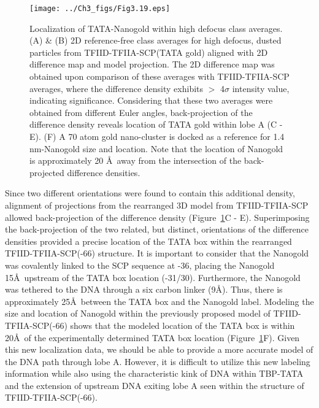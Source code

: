 \begin{figure}
\centering
\texttt{[image: ../Ch3\_figs/Fig3.19.eps]}
\caption[Localization of TATA-Nanogold within high defocus class averages]{Localization of TATA-Nanogold within high defocus class averages. (A) \& (B) 2D reference-free class averages for high defocus, dusted particles from TFIID-TFIIA-SCP(TATA gold) aligned with 2D difference map and model projection. The 2D difference map was obtained upon comparison of these averages with TFIID-TFIIA-SCP averages, where the difference density exhibits $>$ 4$\sigma$ intensity value, indicating significance. Considering that these two averages were obtained from different Euler angles, back-projection of the difference density reveals location of TATA gold within lobe A (C - E). (F) A 70 atom gold nano-cluster \cite{Jadzinsky_2007} is docked as a reference for 1.4 nm-Nanogold size and location. Note that the location of Nanogold is approximately 20 \AA\ away from the intersection of the back-projected difference densities.}
\label{fig:Fig3.19}
\end{figure}
\indent Since two different orientations were found to contain this additional density, alignment of projections from the rearranged 3D model from TFIID-TFIIA-SCP allowed back-projection of the difference density (Figure~\ref{fig:Fig3.19}C - E). Superimposing the back-projection of the two related, but distinct, orientations of the difference densities provided a precise location of the TATA box within the rearranged TFIID-TFIIA-SCP(-66) structure. It is important to consider that the Nanogold was covalently linked to the SCP sequence at -36, placing the Nanogold 15\AA\ upstream of the TATA box location (-31/30).  Furthermore, the Nanogold was tethered to the DNA through a six carbon linker (9\AA). Thus, there is approximately 25\AA\ between the TATA box and the Nanogold label. Modeling the size and location of Nanogold within the previously proposed model of TFIID-TFIIA-SCP(-66) shows that the modeled location of the TATA box is within 20\AA\ of the experimentally determined TATA box location (Figure~\ref{fig:Fig3.19}F). Given this new localization data, we should be able to provide a more accurate model of the DNA path through lobe A. However, it is difficult to utilize this new labeling information while also using the characteristic kink of DNA within TBP-TATA \cite{Kim_3416,Kim_3377} and the extension of upstream DNA exiting lobe A seen within the structure of TFIID-TFIIA-SCP(-66). \\

